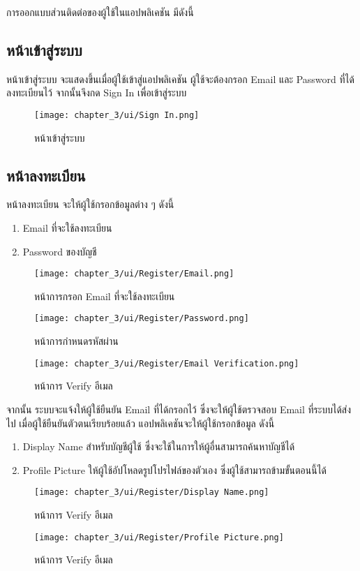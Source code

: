 การออกแบบส่วนติดต่อของผู้ใช้ในแอปพลิเคชัน มีดังนี้
\subsection{หน้าเข้าสู่ระบบ}
หน้าเข้าสู่ระบบ จะแสดงขึ้นเมื่อผู้ใช้เข้าสู่แอปพลิเคชัน ผู้ใช้จะต้องกรอก Email และ Password ที่ได้ลงทะเบียนไว้ จากนั้นจึงกด Sign In เพื่อเข้าสู่ระบบ
\begin{figure}
    \texttt{[image: chapter\_3/ui/Sign In.png]}
    \caption{หน้าเข้าสู่ระบบ}
\end{figure}

\subsection{หน้าลงทะเบียน}
หน้าลงทะเบียน จะให้ผู้ใช้กรอกข้อมูลต่าง ๆ ดังนี้
\begin{enumerate}
    \item Email ที่จะใช้ลงทะเบียน
    \item Password ของบัญชี
\end{enumerate}
\begin{figure}
    \texttt{[image: chapter\_3/ui/Register/Email.png]}
    \caption{หน้าการกรอก Email ที่จะใช้ลงทะเบียน}
\end{figure}
\begin{figure}
    \texttt{[image: chapter\_3/ui/Register/Password.png]}
    \caption{หน้าการกำหนดรหัสผ่าน}
\end{figure}
\begin{figure}
    \texttt{[image: chapter\_3/ui/Register/Email Verification.png]}
    \caption{หน้าการ Verify อีเมล}
\end{figure}
\indent จากนั้น ระบบจะแจ้งให้ผู้ใช้ยืนยัน Email ที่ได้กรอกไว้ ซึ่งจะให้ผู้ใช้ตรวจสอบ Email ที่ระบบได้ส่งไป เมื่อผู้ใช้ยืนยันตัวตนเรียบร้อยแล้ว 
แอปพลิเคชันจะให้ผู้ใช้กรอกข้อมูล ดังนี้
\begin{enumerate}
    \item Display Name สำหรับบัญชีผู้ใช้ ซึ่งจะใช้ในการให้ผู้อื่นสามารถค้นหาบัญชีได้
    \item Profile Picture ให้ผู้ใช้อัปโหลดรูปโปรไฟล์ของตัวเอง ซึ่งผู้ใช้สามารถข้ามขั้นตอนนี้ได้
\end{enumerate}
\begin{figure}
    \texttt{[image: chapter\_3/ui/Register/Display Name.png]}
    \caption{หน้าการ Verify อีเมล}
\end{figure}
\begin{figure}
    \texttt{[image: chapter\_3/ui/Register/Profile Picture.png]}
    \caption{หน้าการ Verify อีเมล}
\end{figure}

